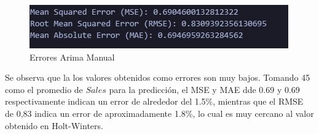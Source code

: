 \begin{figure}[!h]
	\centering
	\includegraphics[width=0.7\linewidth]{error_control_sarimax}
	\caption{Errores Arima Manual}
	\label{fig:errorcontrolsarimax}
\end{figure}

Se observa que la los valores obtenidos como errores son muy bajos. Tomando 45 como el promedio de $Sales$ para la predicción, el MSE y MAE dde 0.69 y 0.69 respectivamente indican un error de alrededor del 1.5\%, mientras que el RMSE de 0,83 indica un error de aproximadamente 1.8\%, lo cual es muy cercano al valor obtenido en Holt-Winters.





